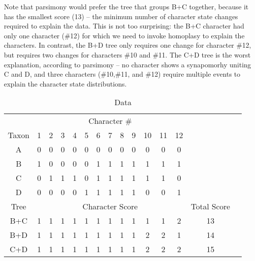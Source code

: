 \documentclass[11pt]{article}
\begin{document}
Note that parsimony would prefer the tree that groups B+C together, because it has the smallest score (13) -- the minimum number of character state changes required to explain the data.
This is not too surprising: the B+C character had only one character (\#12) for which we need to invoke homoplasy to explain the characters.
In contrast, the B+D tree only requires one change for character \#12, but requires two changes for characters \#10 and \#11.
The C+D tree is the worst explanation, according to parsimony -- no character shows a synapomorhy uniting C and D, and three characters (\#10,\#11, and \#12) require multiple events to explain the character state distributions.
\begin{table}[htdp]
\caption{Data}
\begin{center}
\label{charPScores}
\begin{tabular}{|c|c|c|c|c|c|c|c|c|c|c|c|c|c|c|}
\hline 
 & \multicolumn{12}{c|}{Character \#} & \\ 
Taxon &\color{blue} 1 & \color{blue} 2 & \color{blue} 3 & \color{blue} 4 & \color{blue} 5 & \color{green} 6 & \color{green} 7 & \color{green} 8 & \color{green} 9 & \color{red} 10 & \color{red} 11 &  \color{red} 12 &  \\ 
\hline 
A & \color{blue} 0 & \color{blue} 0 & \color{blue} 0 & \color{blue} 0 & \color{blue} 0 & \color{green} 0 & \color{green} 0 & \color{green} 0 & \color{green} 0 & \color{red} 0 & \color{red} 0 & \color{red} 0  &\\
B & \color{blue} 1 & \color{blue} 0 & \color{blue} 0 & \color{blue} 0 & \color{blue} 0 & \color{green} 1 & \color{green} 1 & \color{green} 1 & \color{green} 1 & \color{red} 1 & \color{red} 1 & \color{red} 1 &\\
C &    \color{blue} 0 & \color{blue} 1 & \color{blue} 1 & \color{blue} 1 & \color{blue} 0 & \color{green} 1 & \color{green} 1 & \color{green} 1 & \color{green} 1 & \color{red} 1 & \color{red} 1 & \color{red} 0 &\\
D &    \color{blue} 0 & \color{blue} 0 & \color{blue} 0 & \color{blue} 0 & \color{blue} 1 & \color{green} 1 & \color{green} 1 & \color{green} 1 & \color{green} 1 & \color{red} 0 & \color{red} 0 & \color{red} 1 & \\
\hline
Tree & \multicolumn{12}{c|}{Character Score} & Total Score\\
B+C & 1 & 1 & 1 & 1 & 1 & 1 & 1 & 1 & 1 & \color{red} 1 & \color{red}1 &\color{red} 2 & 13\\
B+D & 1 & 1 & 1 & 1 & 1 & 1 & 1 & 1 & 1 & \color{red}2 & \color{red}2 & \color{red}1 & 14\\
C+D & 1 & 1 & 1 & 1 & 1 & 1 & 1 & 1 & 1 & \color{red}2 &\color{red} 2 & \color{red}2 & 15\\
\hline
\end{tabular}
\end{center}
\end{table}
\end{document}
